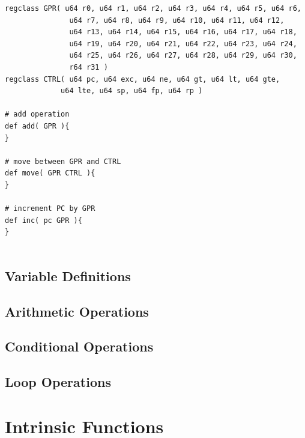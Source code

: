 \documentclass{article}
\begin{document}
\clearpage
\vspace{0.125in}
\begin{lstlisting}[frame=single,style=base,caption={Instruction Prototype Format},captionpos=b,label={lis:instprototype}]
regclass GPR( u64 r0, u64 r1, u64 r2, u64 r3, u64 r4, u64 r5, u64 r6, 
		       u64 r7, u64 r8, u64 r9, u64 r10, u64 r11, u64 r12, 
		       u64 r13, u64 r14, u64 r15, u64 r16, u64 r17, u64 r18,
		       u64 r19, u64 r20, u64 r21, u64 r22, u64 r23, u64 r24, 
		       u64 r25, u64 r26, u64 r27, u64 r28, u64 r29, u64 r30,
		       r64 r31 )
regclass CTRL( u64 pc, u64 exc, u64 ne, u64 gt, u64 lt, u64 gte,
			 u64 lte, u64 sp, u64 fp, u64 rp )

# add operation			 
def add( GPR ){
}

# move between GPR and CTRL 
def move( GPR CTRL ){
}

# increment PC by GPR
def inc( pc GPR ){
}


\end{lstlisting}

\clearpage
\subsection{Variable Definitions}
\label{sec:Variable Definitions}

\clearpage
\subsection{Arithmetic Operations}
\label{sec:Arithmetic Operations}

\clearpage
\subsection{Conditional Operations}
\label{sec:ConditionalOperations}

\clearpage
\subsection{Loop Operations}
\label{sec:LoopOperations}

\clearpage
\section{Intrinsic Functions}
\label{sec:IntrinsicFunctions}
\end{document}
